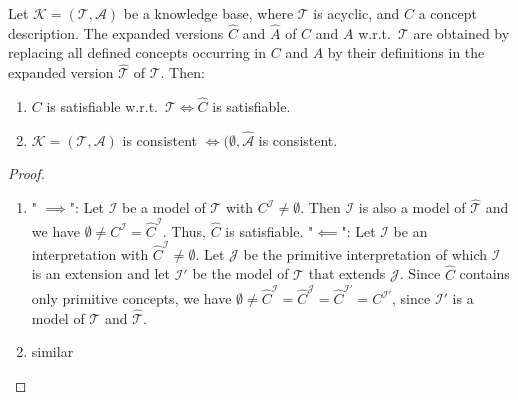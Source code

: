 \begin{prop}
Let  $\mathcal{K} = (\mathcal{T}, \mathcal{A})$ be a knowledge base, where $\mathcal{T}$ is acyclic, and $C$ a concept description.
The expanded versions $\widehat{C}$ and $\widehat{A}$ of $C$ and $A$ w.r.t.\ $\mathcal{T}$ are obtained by
replacing all defined concepts occurring in $C$ and $A$ by their definitions in the expanded version $\widehat{\mathcal{T}}$ of $\mathcal{T}$.
Then:
	\begin{enumerate}
		\item $C$ is satisfiable w.r.t.\ $\mathcal{T} \iff \widehat{C}$ is satisfiable.
		\item $\mathcal{K} = (\mathcal{T},\mathcal{A})$ is consistent $\iff (\emptyset,\widehat{\mathcal{A}}$ is consistent.
	\end{enumerate}
\end{prop}
\begin{proof}
	\begin{enumerate}
		\item " $ \implies$":\newline
			Let $\mathcal{I}$ be a model of $\mathcal{T}$ with $C^\mathcal{I} \neq \emptyset$.
			Then $\mathcal{I}$ is also a model of $\widehat{\mathcal{T}}$ and we have $\emptyset \neq C^\mathcal{I} = \widehat{C}^\mathcal{I}$.
			Thus, $\widehat{C}$ is satisfiable. \newline
			"$ \impliedby$": \newline
			Let $\mathcal{I}$ be an interpretation with $\widehat{C}^{\mathcal{I}} \neq \emptyset$.
			Let $\mathcal{J}$ be the primitive interpretation of which $\mathcal{I}$ is an extension
			and let $\mathcal{I}'$ be the model of $\mathcal{T}$ that extends $\mathcal{J}$.
			Since $\widehat{C}$ contains only primitive concepts,
			we have $\emptyset \neq \widehat{C}^{\mathcal{I}} = \widehat{C}^\mathcal{J} = \widehat{C}^{\mathcal{I'}} = C^{\mathcal{I'}}$,
			since $\mathcal{I}'$ is a model of $\mathcal{T}$ and $\widehat{\mathcal{T}}$.
		\item similar
			\qedhere
	\end{enumerate}
\end{proof}
\newpage

